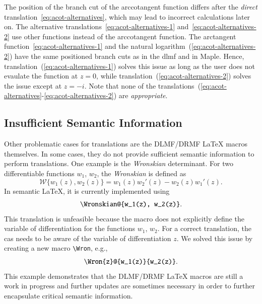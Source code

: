 \documentclass[a4paper,11pt]{article}
\newcommand{\DLMF}{DLMF}
\newcommand{\DRMF}{DRMF}
\newcommand{\Maple}{Maple}
\newcommand{\Macro}{\DLMF/\DRMF{} \LaTeX{} macro}
\theoremstyle{defTheoStyle}
\theoremstyle{defExampStyle}
\DeclareRobustCommand{\iunit}{{i}}
\begin{document}
\vspace{-0.2cm}
The position of the branch cut of the arccotangent function differs after the {\it direct} translation~\eqref{eq:acot-alternatives}, which may lead to incorrect calculations later on. The alternative translations~\eqref{eq:acot-alternatives-1} and~\eqref{eq:acot-alternatives-2} use other functions instead of the arccotangent function. The arctangent function~\eqref{eq:acot-alternatives-1} and the natural logarithm~(\ref{eq:acot-alternatives-2}) have the same positioned branch cuts as in the \gls*{dlmf} and in \Maple. Hence, translation~(\ref{eq:acot-alternatives-1}) solves this issue as long as the user does not evaulate the function at $z = 0$, while translation~(\ref{eq:acot-alternatives-2}) solves the issue except at $z=-\iunit$. Note that none of the translations~(\ref{eq:acot-alternatives}-\ref{eq:acot-alternatives-2}) are {\it appropriate}.

\subsection{Insufficient Semantic Information}
Other problematic cases for translations are the \Macro s themselves. In some cases, they do not provide sufficient semantic information to perform translations. One example is the \textit{Wronskian} determinant. For two differentiable functions $w_1$, $w_2$, the \textit{Wronskian} is defined as~\parencite[(1.13.4)]{NIST:DLMF}
\begin{equation*}
\mathscr{W}\{ w_1(z), w_2(z) \} = w_1(z)w_2'(z) - w_2(z)w_1'(z).
\end{equation*}
In semantic \LaTeX{}, it is currently implemented using
\begin{equation}
	\verb|\Wronskian@{w_1(z), w_2(z)}|.
\end{equation}
This translation is unfeasible because the macro does not explicitly define the variable of differentiation for the functions $w_1$, $w_2$. For a correct translation, the \gls*{cas} needs to be aware of the variable of differentiation $z$. We solved this issue by creating a new macro \verb|\Wron|, e.g.,
\begin{equation}
	\verb|\Wron{z}@{w_1(z)}{w_2(z)}|.
\end{equation}
This example demonstrates that the \Macro s are still a work in progress and further updates are sometimes
necessary in order to further encapsulate critical semantic information.
\end{document}

